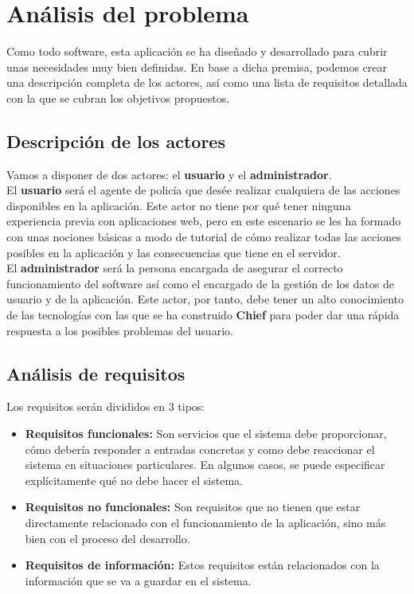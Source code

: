\chapter{Análisis del problema}
 
 Como todo software, esta aplicación se ha diseñado y desarrollado para cubrir unas necesidades muy bien definidas. En base a dicha premisa, podemos crear una descripción completa de los 
 actores, así como una lista de requisitos detallada con la que se cubran los objetivos 
 propuestos.

\section{Descripción de los actores}
Vamos a disponer de dos actores: el \textbf{usuario} y el \textbf{administrador}.\\

El \textbf{usuario} será el agente de policía que desée realizar cualquiera de las acciones
disponibles en la aplicación. Este actor no tiene por qué tener ninguna experiencia previa
con aplicaciones web, pero en este escenario se les ha formado con unas nociones básicas 
a modo de tutorial de cómo realizar todas las acciones posibles en la aplicación y las consecuencias
que tiene en el servidor.\\

El \textbf{administrador} será la persona encargada de asegurar el correcto funcionamiento 
del software así como el encargado de la gestión de los datos de usuario y de la aplicación. Este
actor, por tanto, debe tener un alto conocimiento de las tecnologías con las que se ha construido
\textbf{Chief} para poder dar una rápida respuesta a los posibles problemas del usuario.

\section{Análisis de requisitos}

Los requisitos serán divididos en 3 tipos:

\begin{itemize}
   \item \textbf{Requisitos funcionales:} Son servicios que el sistema debe proporcionar, cómo
   debería responder a entradas concretas y como debe reaccionar el sistema en situaciones 
   particulares. En algunos casos, se puede especificar explícitamente qué no debe hacer el sistema.\cite{software-engineering}

   \item \textbf{Requisitos no funcionales:} Son requisitos que no tienen que estar directamente relacionado
   con el funcionamiento de la aplicación, sino más bien con el proceso del desarrollo.
   
   \item \textbf{Requisitos de información:} Estos requisitos están relacionados con la información 
   que se va a guardar en el sistema.
\end{itemize}

